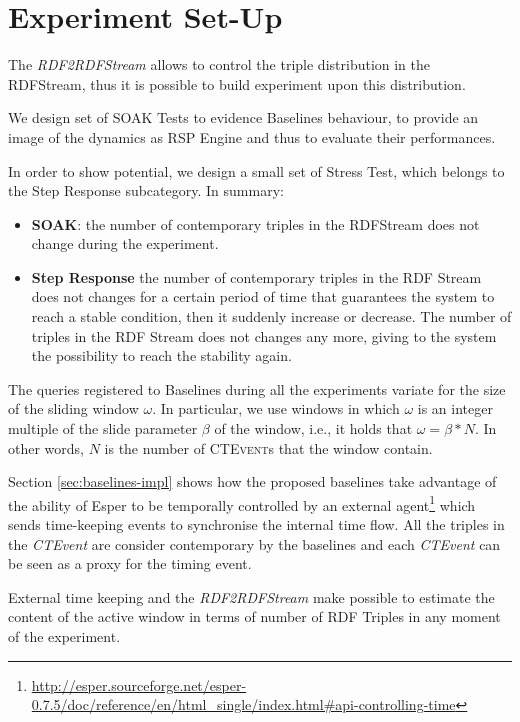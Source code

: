 \section{Experiment Set-Up}

The \textit{RDF2RDFStream} allows to control the triple distribution in the RDFStream, thus it is possible to build experiment upon this distribution. 

We design set of SOAK Tests to evidence Baselines behaviour, to provide an image of the dynamics as RSP Engine  and thus to evaluate their performances. 

In order to show \name potential, we design a small set of Stress Test, which belongs to the Step Response subcategory. In summary:

\begin{itemize}
\item \textbf{SOAK}: the number of contemporary triples in the RDFStream does not change during the experiment.
\item \textbf{Step Response} the number of contemporary triples in the RDF Stream does not changes for a certain period of time that guarantees the system to reach a stable condition, then it suddenly increase or decrease. The number of triples in the RDF Stream does not changes any more, giving to the system the possibility to reach the stability again.
\end{itemize}

The queries registered to \name Baselines during all the experiments variate for the size of the sliding window $\omega$. In particular, we use windows in which $\omega$ is an integer multiple of the slide parameter $\beta$ of the window, i.e., it holds that $\omega = \beta * N$. In other words, $N$ is the number of \textsc{CTEvent}s that the window contain. 

Section \ref{sec:baselines-impl} shows how the proposed baselines take advantage of the ability of Esper to be temporally controlled by an external agent\footnote{\url{http://esper.sourceforge.net/esper-0.7.5/doc/reference/en/html_single/index.html#api-controlling-time}} which sends time-keeping events to synchronise the internal time flow. All the triples in the \textit{CTEvent} are consider contemporary by the baselines and each \textit{CTEvent} can be seen as a proxy for the timing event. 

External time keeping and the \textit{RDF2RDFStream} make possible to estimate the content of the active window in terms of number of RDF Triples in any moment of the experiment.

